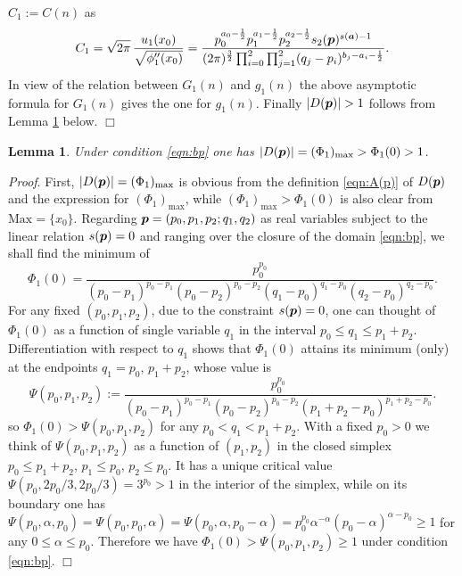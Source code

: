 \documentclass[a4paper,12pt]{article}
\theoremstyle{plain}
\newtheorem{lemma}[theorem]{Lemma}
\def\sba{\mbox{\boldmath ${\scriptstyle a}$}}
\def\bp{\mbox{\boldmath $p$}}
\def\Mm{\mathrm{M{\scriptstyle ax}}}
\begin{document}
$C_1 := C(n)$ as  
\[ 
C_1  
= \sqrt{2 \pi} \, \frac{u_1(x_0)}{\sqrt{\phi_1''(x_0)}} 
= \dfrac{p_0^{a_0- \frac{1}{2} } p_1^{a_1- \frac{1}{2} } p_2^{a_2- \frac{1}{2} } 
s_2(\bp)^{s(\sba) - 1}}{(2 \pi)^{ \frac{3}{2} } 
\prod_{i=0}^2 \prod_{j=1}^2 (q_j-p_i)^{b_j-a_i- \frac{1}{2} }}. 
\] 
In view of the relation between $G_1(n)$ and $g_1(n)$ the above 
asymptotic formula for $G_1(n)$ gives the one for 
$g_1(n)$.  
Finally $|D(\bp)| > 1$ follows from 
Lemma \ref{lem:Phi1(0)} below. \hfill $\Box$ 
\begin{lemma} \label{lem:Phi1(0)} 
Under condition \eqref{eqn:bp} one has  
$|D(\bp) | = (\Phi_1)_{\mathrm{max}} > \Phi_1(0) > 1$. 
\end{lemma}
{\it Proof}. 
First, $|D(\bp)| = (\Phi_1)_{\mathrm{max}}$ is obvious from the definition 
\eqref{eqn:A(p)} of $D(\bp)$ and the expression for 
$(\Phi_1)_{\mathrm{max}}$, while $(\Phi_1)_{\mathrm{max}} > \Phi_1(0)$ 
is also clear from $\Mm = \{ x_0 \}$.   
Regarding $\bp = (p_0,p_1,p_2; q_1, q_2)$ as real variables 
subject to the linear relation $s(\bp) = 0$ and ranging over the 
closure of the domain \eqref{eqn:bp}, we shall find the minimum of  
\[
\Phi_1(0) = \frac{p_0^{p_0}}{(p_0-p_1)^{p_0-p_1} (p_0-p_2)^{p_0-p_2}
(q_1-p_0)^{q_1-p_0}(q_2-p_0)^{q_2-p_0}}.  
\]
For any fixed $(p_0, p_1, p_2)$, due to the constraint $s(\bp) = 0$, 
one can thought of $\Phi_1(0)$ as a function of single variable $q_1$ 
in the interval $p_0 \le q_1 \le p_1 + p_2$. 
Differentiation with respect to $q_1$ shows that $\Phi_1(0)$ attains  
its minimum (only) at the endpoints $q_1 = p_0$, $p_1+p_2$, 
whose value is   
\[ 
\Psi(p_0, p_1, p_2) :=  
\frac{p_0^{p_0}}{(p_0-p_1)^{p_0-p_1} (p_0-p_2)^{p_0-p_2}
(p_1+p_2-p_0)^{p_1+p_2-p_0}}.   
\]
so $\Phi_1(0) > \Psi(p_0, p_1, p_2)$ for any $p_0 < q_1 < p_1+p_2$. 
With a fixed $p_0 > 0$ we think of $\Psi(p_0, p_1, p_2)$ as a function of 
$(p_1, p_2)$ in the closed simplex $p_0 \le p_1 + p_2$, $p_1 \le p_0$, 
$p_2 \le p_0$. 
It has a unique critical value $\Psi(p_0, 2 p_0/3, 2 p_0/3) = 3^{p_0} > 1$ 
in the interior of the simplex, while on its boundary one has 
$\Psi(p_0, \alpha, p_0)  = 
\Psi(p_0, p_0, \alpha)=  \Psi(p_0, \alpha, p_0-\alpha) = p_0^{p_0} 
\alpha^{-\alpha} (p_0-\alpha)^{\alpha-p_0} \ge 1$ for any 
$0 \le \alpha \le p_0$.  
Therefore we have $\Phi_1(0) > \Psi(p_0, p_1, p_2) \ge 1$ 
under condition \eqref{eqn:bp}.  \hfill $\Box$ 
\end{document}
